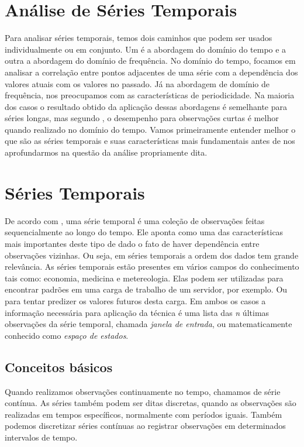 \documentclass[twoside,english,brazilian]{UNISINOSmonografia}
\begin{document}
\section{Análise de Séries Temporais}
Para analisar séries temporais, temos dois caminhos que podem ser usados individualmente ou em conjunto. Um é a abordagem do domínio do tempo e a outra a abordagem do domínio de frequência. No domínio do tempo, focamos em analisar a correlação entre pontos adjacentes de uma série com a dependência dos valores atuais com os valores no passado. Já na abordagem de domínio de frequência, nos preocupamos com as características de periodicidade. Na maioria dos casos o resultado obtido da aplicação dessas abordagens é semelhante para séries longas, mas segundo \cite{Shumway2000}, o desempenho para observações curtas é melhor quando realizado no domínio do tempo.
Vamos primeiramente entender melhor o que são as séries temporais e suas características mais fundamentais antes de nos aprofundarmos na questão da análise propriamente dita.

\section{Séries Temporais}
De acordo com \cite{Ehlers2009}, uma série temporal é uma coleção de observações feitas sequencialmente ao longo do tempo. Ele aponta como uma das características mais importantes deste tipo de dado o fato de haver dependência entre observações vizinhas. Ou seja, em séries temporais a ordem dos dados tem grande relevância. As séries temporais estão presentes em vários campos do conhecimento tais como: economia, medicina e metereologia. Elas podem ser utilizadas para encontrar padrões em uma carga de trabalho de um servidor, por exemplo. Ou para tentar predizer os valores futuros desta carga. Em ambos os casos a informação necessária para aplicação da técnica é uma lista das \textit{n} últimas observações da série temporal, chamada \textit{janela de entrada}, ou matematicamente conhecido como \textit{espaço de estados}.

\subsection{Conceitos básicos}
Quando realizamos observações continuamente no tempo, chamamos de série contínua. As séries também podem ser ditas discretas, quando as observações são realizadas em tempos específicos, normalmente com períodos iguais. Também podemos discretizar séries contínuas ao registrar observações em determinados intervalos de tempo.
\end{document}
